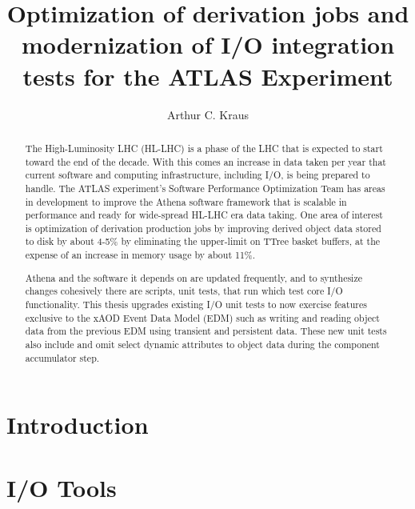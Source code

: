 \documentclass[12pt]{niuthesis}
\title{Optimization of derivation jobs and modernization of I/O integration tests for the ATLAS Experiment}
\author{Arthur C. Kraus}
\begin{document}
\begin{abstract}
The High-Luminosity LHC (HL-LHC) is a phase of the LHC that is expected to start toward the end of the decade. 
With this comes an increase in data taken per year that current software and computing infrastructure, including I/O, is being prepared to handle. 
The ATLAS experiment's Software Performance Optimization Team has areas in development to improve the Athena software framework that is scalable in performance and ready for wide-spread HL-LHC era data taking. 
One area of interest is optimization of derivation production jobs by improving derived object data stored to disk by about 4-5\% by eliminating the upper-limit on TTree basket buffers, at the expense of an increase in memory usage by about 11\%. 

Athena and the software it depends on are updated frequently, and to synthesize changes cohesively there are scripts, unit tests, that run which test core I/O functionality. 
This thesis upgrades existing I/O unit tests to now exercise features exclusive to the xAOD Event Data Model (EDM) such as writing and reading object data from the previous EDM using transient and persistent data. 
These new unit tests also include and omit select dynamic attributes to object data during the component accumulator step. 
\end{abstract}

\begin{dedication}

\end{dedication}

\begin{acknowledgements}

\end{acknowledgements}
\MakeThesisPrologue




\chapter{Introduction}
\label{chap:Intro}


\chapter{I/O Tools}
\label{chap:IO_Tools}


\end{document}
